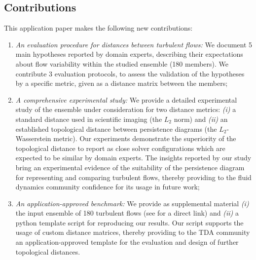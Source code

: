 \subsection{Contributions}
This application paper makes the following new contributions:
\vspace{-1ex}
\begin{enumerate}[itemsep=-0.75ex]
 \item{\emph{An evaluation procedure for distances between turbulent
flows:}
 We document 5 main hypotheses reported by domain experts, describing their
expectations
about
flow variability
within the studied ensemble (180 members).
We contribute 3 evaluation protocols,
to assess
the validation of the
hypotheses by a specific metric,
given as a distance matrix between the members;}
 \item{\emph{A comprehensive experimental study:}
 We provide a detailed experimental study of the ensemble under consideration
for two distance metrics: \emph{(i)} a standard distance used in scientific
imaging (the $L_2$ norm) and \emph{(ii)} an established topological distance
between persistence diagrams (the $L_2$-Wasserstein metric). Our
experiments demonstrate the superiority of the topological distance to report
as close solver configurations which are expected to be similar by domain
experts. The insights reported by our study bring an experimental evidence
of the suitability of the persistence diagram for representing and comparing
turbulent flows, thereby providing to the fluid dynamics community confidence
for its usage in future work;}
 \item{\emph{An application-approved benchmark:}
 We provide as supplemental material \emph{(i)} the input ensemble of 180
turbulent flows (see \cite{data} for a direct link)
and
\emph{(ii)} a python template script for reproducing our results.
Our script supports the usage of custom distance matrices, thereby providing to
the TDA community an application-approved template for the evaluation and design
of further topological distances.
}


\end{enumerate}

